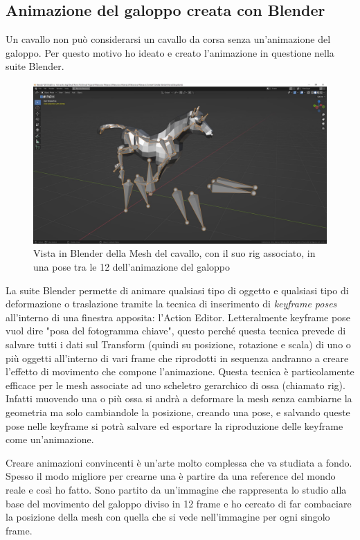     \subsection{Animazione del galoppo creata con Blender}

    Un cavallo non può considerarsi un cavallo da corsa senza un'animazione del galoppo.
    Per questo motivo ho ideato e creato l'animazione in questione nella suite Blender.

    \begin{figure}[b]
        \centering
        \includegraphics[width=.9\textwidth]{figure/HorseRig.JPG}
        \caption{Vista in Blender della Mesh del cavallo, con il suo rig associato, in una pose tra le 12 dell'animazione del galoppo}
    \end{figure}

    La suite Blender permette di animare qualsiasi tipo di oggetto e qualsiasi tipo di deformazione o traslazione tramite la tecnica di inserimento di \textit{keyframe poses} all'interno di una finestra apposita: l'Action Editor. 
    Letteralmente keyframe pose vuol dire "posa del fotogramma chiave", questo perché questa tecnica prevede di salvare tutti i dati sul Transform (quindi su posizione, rotazione e scala) di uno o più oggetti all'interno di vari frame che riprodotti in sequenza andranno a creare l'effetto di movimento che compone l'animazione.
    Questa tecnica è particolamente efficace per le mesh associate ad uno scheletro gerarchico di ossa (chiamato rig).
    Infatti muovendo una o più ossa si andrà a deformare la mesh senza cambiarne la geometria ma solo cambiandole la posizione, creando una pose, e salvando queste pose nelle keyframe si potrà salvare ed esportare la riproduzione delle keyframe come un'animazione.

    Creare animazioni convincenti è un'arte molto complessa che va studiata a fondo.
    Spesso il modo migliore per crearne una è partire da una reference del mondo reale e così ho fatto.
    Sono partito da un'immagine che rappresenta lo studio alla base del movimento del galoppo diviso in 12 frame e ho cercato di far combaciare la posizione della mesh con quella che si vede nell'immagine per ogni singolo frame.

